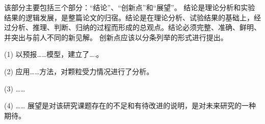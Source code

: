 该部分主要包括三个部分：“结论”、“创新点”和“展望”。
结论是理论分析和实验结果的逻辑发展，是整篇论文的归宿。结论是在理论分析、试验结果的基础上，经过分析、推理、判断、归纳的过程而形成的总观点。结论必须完整、准确、鲜明、并突出与前人不同的新见解。
创新点应该以分条列举的形式进行提出。\par
(1) 以预报……模型，建立了….。 \par
(2) 应用……方法，对颗粒受力情况进行了分析。\par
(3) ……\par
(4) ……
展望是对该研究课题存在的不足和有待改进的说明，是对未来研究的一种期待。


